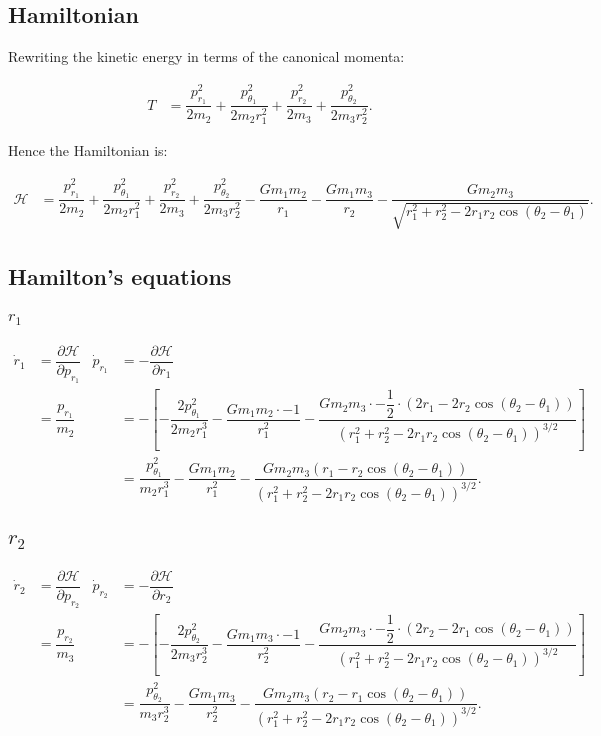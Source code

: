 \documentclass[12pt,a4paper,portrait]{article}
\begin{document}
	\subsection{Hamiltonian}
	Rewriting the kinetic energy in terms of the canonical momenta:
	
	\begin{align*}
		T &= \dfrac{p_{r_1}^2}{2m_2}+\dfrac{p_{\theta_1}^2}{2m_2r_1^2} + \dfrac{p_{r_2}^2}{2m_3}+\dfrac{p_{\theta_2}^2}{2m_3r_2^2}.
	\end{align*}
	
	Hence the Hamiltonian is:
	
	\begin{align*}
		\mathcal{H} &= \dfrac{p_{r_1}^2}{2m_2}+\dfrac{p_{\theta_1}^2}{2m_2r_1^2} + \dfrac{p_{r_2}^2}{2m_3}+\dfrac{p_{\theta_2}^2}{2m_3r_2^2} -\dfrac{Gm_1m_2}{r_1} - \dfrac{Gm_1m_3}{r_2} - \dfrac{Gm_2 m_3}{\sqrt{r_1^2 + r_2^2 - 2r_1 r_2 \cos{(\theta_2-\theta_1)}}}.
	\end{align*}
	\subsection{Hamilton's equations}
	\subsubsection{$r_1$}
	\begin{align*}
		\dot{r}_1 &= \dfrac{\partial \mathcal{H}}{\partial p_{r_1}} & \dot{p}_{r_1} &= -\dfrac{\partial \mathcal{H}}{\partial r_1} \\
		&= \dfrac{p_{r_1}}{m_2} & &=-\left[ -\dfrac{2p_{\theta_1}^2}{2m_2r_1^3} - \dfrac{Gm_1m_2\cdot -1}{r_1^2} - \dfrac{Gm_2m_3\cdot -\dfrac{1}{2} \cdot(2r_1-2r_2\cos{(\theta_2-\theta_1)})}{(r_1^2 + r_2^2 - 2r_1 r_2 \cos{(\theta_2-\theta_1)})^{3/2}} \right]\\
		&& &= \dfrac{p_{\theta_1}^2}{m_2r_1^3} - \dfrac{Gm_1m_2}{r_1^2} - \dfrac{Gm_2m_3(r_1-r_2\cos{(\theta_2-\theta_1)})}{(r_1^2 + r_2^2 - 2r_1 r_2 \cos{(\theta_2-\theta_1)})^{3/2}}.
	\end{align*}
	\subsection{$r_2$}
	\begin{align*}
		\dot{r}_2 &= \dfrac{\partial \mathcal{H}}{\partial p_{r_2}} & \dot{p}_{r_2} &= -\dfrac{\partial \mathcal{H}}{\partial r_2}\\
		&= \dfrac{p_{r_2}}{m_3} & &= -\left[-\dfrac{2p_{\theta_2}^2}{2m_3r_2^3} - \dfrac{Gm_1m_3\cdot-1}{r_2^2} - \dfrac{Gm_2m_3 \cdot -\dfrac{1}{2}\cdot (2r_2 -2r_1\cos{(\theta_2-\theta_1)})}{(r_1^2 + r_2^2 - 2r_1 r_2 \cos{(\theta_2-\theta_1)})^{3/2}}\right] \\
		& & &= \dfrac{p_{\theta_2}^2}{m_3r_2^3} - \dfrac{Gm_1m_3}{r_2^2} - \dfrac{Gm_2m_3(r_2-r_1\cos{(\theta_2-\theta_1)})}{(r_1^2 + r_2^2 - 2r_1 r_2 \cos{(\theta_2-\theta_1)})^{3/2}}.
	\end{align*}
\end{document}
